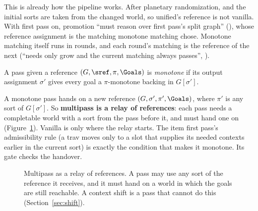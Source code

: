 This is already how the pipeline works. After planetary randomization,  and the initial sorts are taken from the changed world, so unified's reference is not vanilla. With first pass on, promotion ``must reason over first pass's split graph'' (), whose reference assignment is the matching monotone matching chose. Monotone matching itself runs in rounds, and each round's matching is the reference of the next (``needs only grow and the current matching always passes'', ).

\begin{definition}
A pass given a reference $(G,\sref,\pi,\Goals)$ is \emph{monotone} if its output assignment $\sigma'$ gives every goal a $\pi$-monotone backing in $G[\sigma']$.
\end{definition}

A monotone pass hands on a new reference $(G,\sigma',\pi',\Goals)$, where $\pi'$ is any sort of $G[\sigma']$. So \textbf{multipass is a relay of references}: each pass needs a completable world with a sort from the pass before it, and must hand one on (Figure~\ref{fig:relay}). Vanilla is only where the relay starts. The item first pass's admissibility rule (a trav moves only to a slot that supplies its needed contexts earlier in the current sort) is exactly the condition that makes it monotone. Its gate checks the handover.

\begin{figure}[t]
\centering
{}
\caption{Multipass as a relay of references. A pass may use any sort of the reference it receives, and it must hand on a world in which the goals are still reachable. A context shift is a pass that cannot do this (Section~\ref{sec:shift}).}
\label{fig:relay}
\end{figure}
